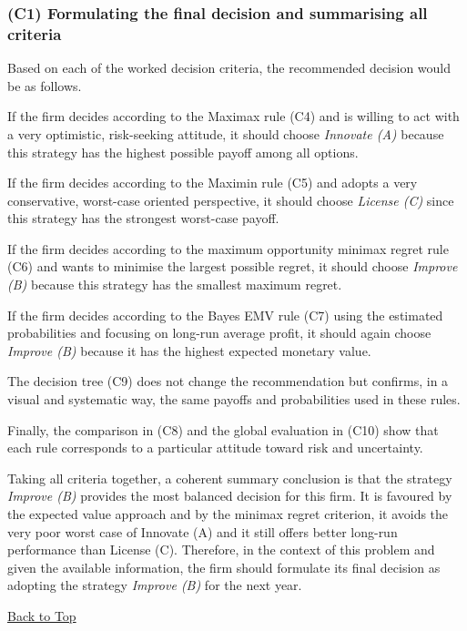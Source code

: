 \documentclass[11pt]{article}
\begin{document}
	\subsubsection{(C1) Formulating the final decision and summarising all criteria}\label{example-1-c1}
	
	Based on each of the worked decision criteria, the recommended decision would be as follows.
	
	If the firm decides according to the Maximax rule (C4) and is willing to act with a very optimistic, risk-seeking attitude,
	it should choose \emph{Innovate (A)} because this strategy has the highest possible payoff among all options.
	
	If the firm decides according to the Maximin rule (C5) and adopts a very conservative, worst-case oriented perspective,
	it should choose \emph{License (C)} since this strategy has the strongest worst-case payoff.
	
	If the firm decides according to the maximum opportunity minimax regret rule (C6) and wants to minimise the largest possible regret,
	it should choose \emph{Improve (B)} because this strategy has the smallest maximum regret.
	
	If the firm decides according to the Bayes EMV rule (C7) using the estimated probabilities and focusing on long-run average profit,
	it should again choose \emph{Improve (B)} because it has the highest expected monetary value.
	
	The decision tree (C9) does not change the recommendation but confirms, in a visual and systematic way,
	the same payoffs and probabilities used in these rules.
	
	Finally, the comparison in (C8) and the global evaluation in (C10) show that each rule corresponds to a particular attitude
	toward risk and uncertainty.
	
	Taking all criteria together, a coherent summary conclusion is that the strategy \emph{Improve (B)}
	provides the most balanced decision for this firm.
	It is favoured by the expected value approach and by the minimax regret criterion,
	it avoids the very poor worst case of Innovate (A) and it still offers better long-run performance than License (C).
	Therefore, in the context of this problem and given the available information,
	the firm should formulate its final decision as adopting the strategy \emph{Improve (B)} for the next year.
	
	\vspace{6pt}
	\noindent\hyperref[table-of-contents]{Back to Top}
	
\end{document}
